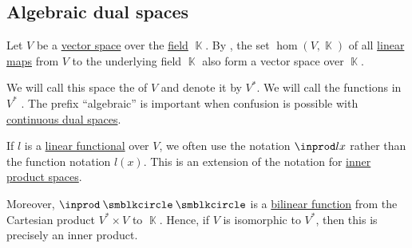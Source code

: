 \subsection{Algebraic dual spaces}\label{subsec:algebraic_dual_spaces}

\begin{definition}\label{def:dual_vector_space}
  Let \( V \) be a \hyperref[def:vector_space]{vector space} over the \hyperref[def:field]{field} \( \BbbK \). By , the set \( \hom(V, \BbbK) \) of all \hyperref[def:semimodule/homomorphism]{linear maps} from \( V \) to the underlying field \( \BbbK \) also form a vector space over \( \BbbK \).

  We will call this space the  of \( V \) and denote it by \( V^* \). We will call the functions in \( V^* \) . The prefix \enquote{algebraic} is important when confusion is possible with \hyperref[def:continuous_dual_space]{continuous dual spaces}.
\end{definition}

\begin{remark}\label{rem:dual_space_bilinear_form}
  If \( l \) is a \hyperref[def:dual_vector_space]{linear functional} over \( V \), we often use the notation \( \inprod l x \) rather than the function notation \( l(x) \). This is an extension of the notation for \hyperref[def:inner_product_space]{inner product spaces}.

  Moreover, \( \inprod \anon \anon \) is a \hyperref[def:multilinear_function]{bilinear function} from the Cartesian product \( V^* \times V \) to \( \BbbK \). Hence, if \( V \) is isomorphic to \( V^* \), then this is precisely an inner product.
\end{remark}

